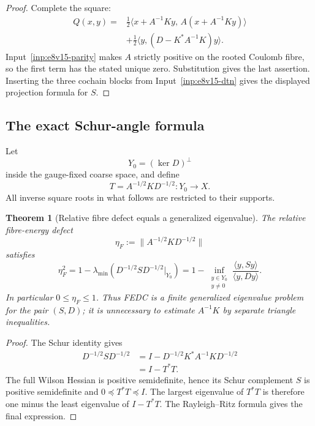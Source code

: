 \documentclass[11pt,oneside]{book}
\newtheorem{theorem}{Theorem}[chapter]
\theoremstyle{definition}
\theoremstyle{remark}
\begin{document}
\begin{proof}
Complete the square:
\[
\begin{split}
Q(x,y)
={}&\frac12\langle x+A^{-1}Ky,\,
                  A(x+A^{-1}Ky)\rangle\\
 &+\frac12\langle y,(D-K^*A^{-1}K)y\rangle .
\end{split}
\]
Input~\ref{inp:e8v15-parity} makes \(A\) strictly positive on the
rooted Coulomb fibre, so the first term has the stated unique zero.
Substitution gives the last assertion.  Inserting the three cochain
blocks from Input~\ref{inp:e8v15-dtn} gives the displayed projection
formula for \(S\).
\end{proof}

\subsection{The exact Schur-angle formula}

Let
\[
 Y_0=(\ker D)^\perp
\]
inside the gauge-fixed coarse space, and define
\[
             T=A^{-1/2}KD^{-1/2}:Y_0\longrightarrow X.
\]
All inverse square roots in what follows are restricted to their
supports.

\begin{theorem}[Relative fibre defect equals a generalized eigenvalue]
\label{thm:e8v15-angle}
The relative fibre-energy defect
\[
       \eta_F:=\|A^{-1/2}KD^{-1/2}\|
\]
satisfies
\[
\boxed{\quad
\eta_F^2
=1-\lambda_{\min}
  \left(D^{-1/2}SD^{-1/2}\big|_{Y_0}\right)
=1-\inf_{\substack{y\in Y_0\\y\ne0}}
       \frac{\langle y,Sy\rangle}{\langle y,Dy\rangle}.
\quad}
\]
In particular \(0\leq\eta_F\leq1\).  Thus FEDC is a finite generalized
eigenvalue problem for the pair \((S,D)\); it is unnecessary to
estimate \(A^{-1}K\) by separate triangle inequalities.
\end{theorem}

\begin{proof}
The Schur identity gives
\[
\begin{split}
D^{-1/2}SD^{-1/2}
 &=I-D^{-1/2}K^*A^{-1}KD^{-1/2}\\
 &=I-T^*T.
\end{split}
\]
The full Wilson Hessian is positive semidefinite, hence its Schur
complement \(S\) is positive semidefinite and \(0\preceq T^*T\preceq I\).
The largest eigenvalue of \(T^*T\) is therefore one minus the least
eigenvalue of \(I-T^*T\).  The Rayleigh--Ritz formula gives the final
expression.
\end{proof}
\end{document}
